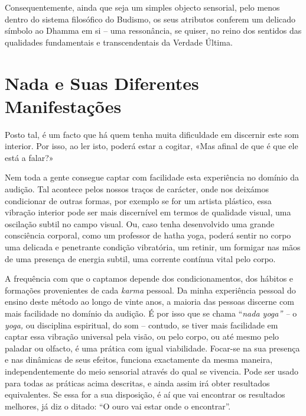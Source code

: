 Consequentemente, ainda que seja um simples objecto sensorial, pelo
menos dentro do sistema filosófico do Budismo, os seus atributos
conferem um delicado símbolo ao Dhamma em si -- uma ressonância, se
quiser, no reino dos sentidos das qualidades fundamentais e
transcendentais da Verdade Última.

\section{Nada e Suas Diferentes Manifestações}

Posto tal, é um facto que há quem tenha muita dificuldade em discernir
este som interior. Por isso, ao ler isto, poderá estar a cogitar, «Mas
afinal de que é que ele está a falar?»

Nem toda a gente consegue captar com facilidade esta experiência no
domínio da audição. Tal acontece pelos nossos traços de carácter, onde
nos deixámos condicionar de outras formas, por exemplo se for um artista
plástico, essa vibração interior pode ser mais discernível em termos de
qualidade visual, uma oscilação subtil no campo visual. Ou, caso tenha
desenvolvido uma grande consciência corporal, como um professor de hatha
yoga, poderá sentir no corpo uma delicada e penetrante condição
vibratória, um retinir, um formigar nas mãos de uma presença de energia
subtil, uma corrente contínua vital pelo corpo.

A frequência com que o captamos depende dos condicionamentos, dos
hábitos e formações provenientes de cada \emph{karma} pessoal. Da minha
experiência pessoal do ensino deste método ao longo de vinte anos, a
maioria das pessoas discerne com mais facilidade no domínio da audição.
É por isso que se chama ``\emph{nada yoga'' --} o \emph{yoga,} ou
disciplina espiritual, do som -- contudo, se tiver mais facilidade em
captar essa vibração universal pela visão, ou pelo corpo, ou até mesmo
pelo paladar ou olfacto, é uma prática com igual viabilidade. Focar-se
na sua presença e nas dinâmicas de seus efeitos, funciona exactamente da
mesma maneira, independentemente do meio sensorial através do qual se
vivencia. Pode ser usado para todas as práticas acima descritas, e ainda
assim irá obter resultados equivalentes. Se essa for a sua disposição, é
aí que vai encontrar os resultados melhores, já diz o ditado: ``O ouro
vai estar onde o encontrar''.
